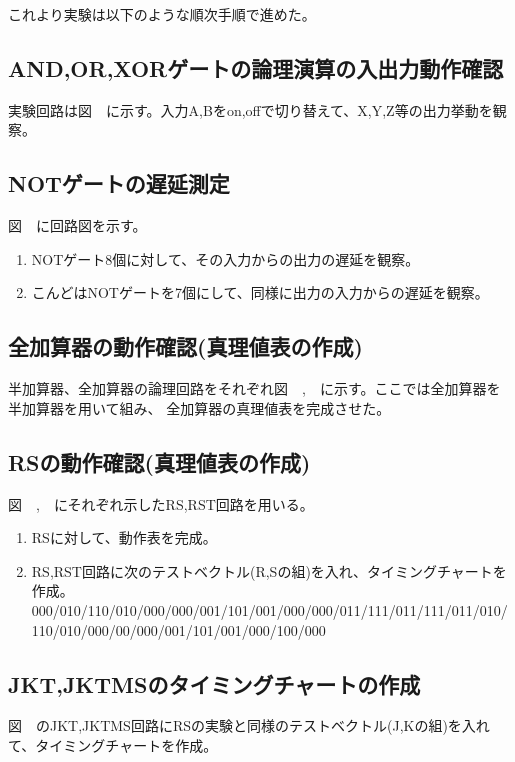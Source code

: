 \documentclass[11pt,a4j]{jsarticle}
\begin{document}
   
  これより実験は以下のような順次手順で進めた。
  
  \subsection{AND,OR,XORゲートの論理演算の入出力動作確認}
  実験回路は図\ \ に示す。入力A,Bをon,offで切り替えて、X,Y,Z等の出力挙動を観察。

  
  \subsection{NOTゲートの遅延測定}
  図\ \ に回路図を示す。
  \begin{enumerate}
   \item NOTゲート8個に対して、その入力からの出力の遅延を観察。
   \item こんどはNOTゲートを7個にして、同様に出力の入力からの遅延を観察。
  \end{enumerate}
  
  \newpage

  
  \subsection{全加算器の動作確認(真理値表の作成)}
  半加算器、全加算器の論理回路をそれぞれ図\ \ ,\ \ に示す。ここでは全加算器を半加算器を用いて組み、
  全加算器の真理値表を完成させた。

  
  \subsection{RSの動作確認(真理値表の作成)}
  図\ \ ,\ \ にそれぞれ示したRS,RST回路を用いる。
  \begin{enumerate}
   \item RSに対して、動作表を完成。
   \item RS,RST回路に次のテストベクトル(R,Sの組)を入れ、タイミングチャートを作成。\\
   000/010/110/010/000/000/001/101/001/000/000/011/111/011/111/011/010/110/010/000/00/000/001/101/001/000/100/000
  \end{enumerate}

  
  \subsection{JKT,JKTMSのタイミングチャートの作成}
  図\ \ のJKT,JKTMS回路にRSの実験と同様のテストベクトル(J,Kの組)を入れて、タイミングチャートを作成。
  
\end{document}
